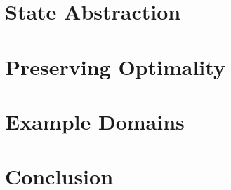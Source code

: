 \documentclass[11pt]{article}
\begin{document}
\section{State Abstraction}


\section{Preserving Optimality}


\section{Example Domains}


\section{Conclusion}








\end{document}
